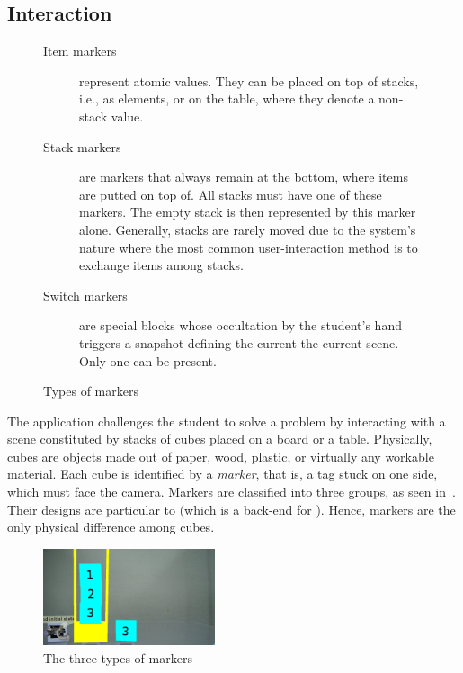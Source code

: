 \subsection{Interaction}

\begin{figure}
  \begin{fminipage}
    \begin{description}
    \item[Item markers] represent atomic values. They can be placed on
      top of stacks, i.e., as elements, or on the table, where they
      denote a non\hyp{}stack value.
    \item[Stack markers] are markers that always remain at the bottom,
      where items are putted on top of. All stacks must have
      one of these markers. The empty stack is then represented by
      this marker alone. Generally, stacks are rarely moved due to the
      system's nature where the most common user\hyp{}interaction
      method is to exchange items among stacks.
    \item[Switch markers] are special blocks whose occultation by
      the student's hand triggers a snapshot defining the current the
      current scene. Only one can be present.
    \end{description}
  \end{fminipage}
  \caption{Types of markers}
  \label{fig:list:markers}
\end{figure}

The \vestige application challenges the student to solve a problem by
interacting with a scene constituted by stacks of cubes placed on a
board or a table. Physically, cubes are objects made out of paper,
wood, plastic, or virtually any workable material. Each cube is
identified by a \emph{marker}, that is, a tag stuck on one side, which
must face the camera. Markers are classified into three groups, as
seen in~. Their designs are particular to
\artoolkit (which is a back\hyp{}end for \osgart). Hence, markers are
the only physical difference among cubes.

\begin{figure}
  \centering
  \includegraphics[width=0.45\textwidth]{img/iface/markers.png}
  \caption{The three types of markers}
  \label{fig:iface:markers}
\end{figure}

